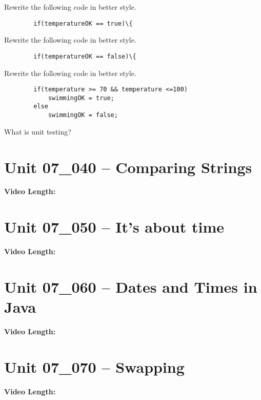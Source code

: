 \documentclass[letterpaper,12pt]{exam}
\newcommand{\unit}{Unit 07}
\begin{document}
\begin{questions}
\begin{samepage}
    \question Rewrite the following code in better style.
    \begin{verbatim}
        if(temperatureOK == true)\{
    \end{verbatim}    
    \vspace{5mm}
\end{samepage}


\begin{samepage}
    \question Rewrite the following code in better style.
    \begin{verbatim}
        if(temperatureOK == false)\{
    \end{verbatim}    
    \vspace{5mm}
\end{samepage}


\begin{samepage}
    \question Rewrite the following code in better style.
    \begin{verbatim}
        if(temperature >= 70 && temperature <=100)
            swimmingOK = true;
        else
            swimmingOK = false;
    \end{verbatim}    
    \vspace{5mm}
\end{samepage}

\begin{samepage}
    \question What is unit testing?
    \vspace{5mm}
\end{samepage}

\section*{\unit\_040 -- Comparing Strings} %
\noindent \textbf{Video Length: }

\section*{\unit\_050 -- It's about time} %
\noindent \textbf{Video Length: }
\section*{\unit\_060 -- Dates and Times in Java} %
\noindent \textbf{Video Length: }
\section*{\unit\_070 -- Swapping} %
\noindent \textbf{Video Length: }


\end{questions}
\end{document}
